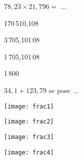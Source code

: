 \begin{QCM}
\begin{GroupeQCM}
    
     \begin{exercice}
      $78,23 \times 21,796 =$ ...
      \begin{ChoixQCM}{4}
      \item 170\,510,108
      \item 3\,705,101\,08
      \item 1\,705,101\,08
      \item 1\,800
      \end{ChoixQCM}
      \begin{corrige}
   \end{corrige}
    \end{exercice}
    
     \begin{exercice}
      $34,1 + 123,79$ se pose ...
      \begin{ChoixQCM}{4}
      \item 
      
      \texttt{[image: frac1]}
      \item 
      
      \texttt{[image: frac2]}
      \item 
      
      \texttt{[image: frac3]}
      \item 
      
      \texttt{[image: frac4]}
      \end{ChoixQCM}
      \begin{corrige}
   \end{corrige}
    \end{exercice}
   
\end{GroupeQCM}
\end{QCM}

  
